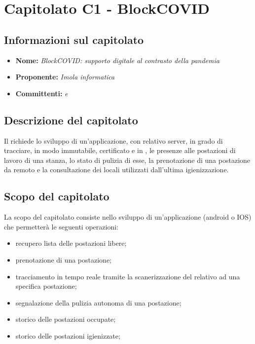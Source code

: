 \section{Capitolato C1 - BlockCOVID}
\subsection{Informazioni sul capitolato}
\begin{itemize}
	\item \textbf{Nome:} \textit{BlockCOVID: supporto digitale al contrasto della pandemia}
	\item \textbf{Proponente:} \textit{Imola informatica}
	\item \textbf{Committenti:} \textit{\VT{} e \CR{}}
\end{itemize}

\subsection{Descrizione del capitolato}
Il  richiede lo sviluppo di un'applicazione, con relativo server, in grado di tracciare, in modo immutabile, certificato e in , le presenze alle postazioni di lavoro di una stanza, lo stato di pulizia di esse, la prenotazione di una postazione da remoto e la consultazione dei locali utilizzati dall'ultima igienizzazione.

\subsection{Scopo del capitolato}
La scopo del capitolato consiste nello sviluppo di un'applicazione (android o IOS) che permetterà le seguenti operazioni:
\begin{itemize}
	\item recupero lista delle postazioni libere;
	\item prenotazione di una postazione;
	\item tracciamento in tempo reale tramite la scanerizzazione del  relativo ad una specifica postazione;
	\item segnalazione della pulizia autonoma di una postazione;
	\item storico delle postazioni occupate;
	\item storico delle postazioni igienizzate;
\end{itemize}

